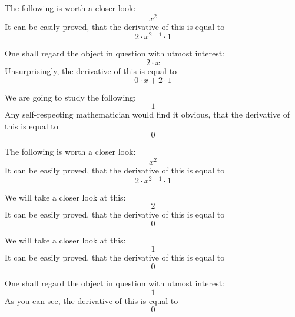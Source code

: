 \documentclass{article}
\begin{document}
The following is worth a closer look:
\begin{equation}
x ^{2 } 
\end{equation}
It can be easily proved, that the derivative of this is equal to
\begin{equation}
2 \cdot x ^{2 - 1 } \cdot 1 
\end{equation}

One shall regard the object in question with utmost interest:
\begin{equation}
2 \cdot x 
\end{equation}
Unsurprisingly, the derivative of this is equal to
\begin{equation}
0 \cdot x + 2 \cdot 1 
\end{equation}

We are going to study the following:
\begin{equation}
1 
\end{equation}
Any self-respecting mathematician would find it obvious, that the derivative of this is equal to
\begin{equation}
0 
\end{equation}

The following is worth a closer look:
\begin{equation}
x ^{2 } 
\end{equation}
It can be easily proved, that the derivative of this is equal to
\begin{equation}
2 \cdot x ^{2 - 1 } \cdot 1 
\end{equation}

We will take a closer look at this:
\begin{equation}
2 
\end{equation}
It can be easily proved, that the derivative of this is equal to
\begin{equation}
0 
\end{equation}

We will take a closer look at this:
\begin{equation}
1 
\end{equation}
It can be easily proved, that the derivative of this is equal to
\begin{equation}
0 
\end{equation}

One shall regard the object in question with utmost interest:
\begin{equation}
1 
\end{equation}
As you can see, the derivative of this is equal to
\begin{equation}
0 
\end{equation}
\end{document}
